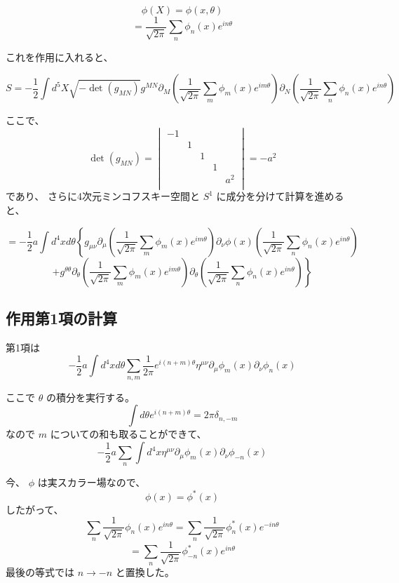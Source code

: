 \documentclass{article}
\begin{document}
$$
	\phi(X)
	=
	\phi(x,\theta)
$$
$$
	=
	\dfrac{1}{
		\sqrt{ 2 \pi}
	}
	\sum_{n}
	\phi_{n}(x)
	e^{i n \theta}
$$

これを作用に入れると、

$$
	S
	=
	- \dfrac{1}{2}
	\int d^{5} X
	\sqrt{ - \det(g_{MN}) }
	g^{MN}
	\partial_{M}
	\left(
	\dfrac{1}{
		\sqrt{ 2 \pi}
	}
	\sum_{m}
	\phi_{m}(x)
	e^{i m \theta}
	\right)
	\partial_{N}
	\left(
	\dfrac{1}{
		\sqrt{ 2 \pi}
	}
	\sum_{n}
	\phi_{n}(x)
	e^{i n \theta}
	\right)
$$

ここで、
$$
	\det(g_{MN})
	=
	\begin{vmatrix}
		-1 &   &   &   &       \\
		   & 1 &   &   &       \\
		   &   & 1 &   &       \\
		   &   &   & 1 &       \\
		   &   &   &   & a^{2} \\
	\end{vmatrix}
	=
	- a^{2}
$$
であり、
さらに4次元ミンコフスキー空間と
$S^{1}$
に成分を分けて計算を進めると、

$$
	=
	- \dfrac{1}{2}
	a
	\int d^{4} x d \theta
	\left\{
	g_{\mu \nu}
	\partial_{\mu}
	\left(
	\dfrac{1}{
		\sqrt{ 2 \pi}
	}
	\sum_{m}
	\phi_{m}(x)
	e^{i m \theta}
	\right)
	\partial_{\nu}
	\phi(x)
	\left(
	\dfrac{1}{
		\sqrt{ 2 \pi}
	}
	\sum_{n}
	\phi_{n}(x)
	e^{i n \theta}
	\right)
	\right.
$$
$$
	\left.
	+
	g^{\theta \theta}
	\partial_{\theta}
	\left(
	\dfrac{1}{
		\sqrt{ 2 \pi}
	}
	\sum_{m}
	\phi_{m}(x)
	e^{i m \theta}
	\right)
	\partial_{\theta}
	\left(
	\dfrac{1}{
		\sqrt{ 2 \pi}
	}
	\sum_{n}
	\phi_{n}(x)
	e^{i n \theta}
	\right)
	\right\}
$$

\subsection{作用第1項の計算}

第1項は
$$
	- \dfrac{1}{2}
	a
	\int d^{4} x d \theta
	\sum_{n,m}
	\dfrac{1}{2 \pi}
	e^{i (n+m) \theta}
	\eta^{\mu \nu}
	\partial_{\mu}
	\phi_{m}(x)
	\partial_{\nu}
	\phi_{n}(x)
$$

ここで
$\theta$
の積分を実行する。
$$
	\int d \theta
	e^{i (n+m) \theta}
	=
	2 \pi
	\delta_{n,-m}
$$
なので
$m$
についての和も取ることができて、
$$
	- \dfrac{1}{2}
	a
	\sum_{n}
	\int d^{4} x
	\eta^{\mu \nu}
	\partial_{\mu}
	\phi_{m}(x)
	\partial_{\nu}
	\phi_{-n}(x)
$$

今、
$\phi$
は実スカラー場なので、
$$
	\phi(x) = \phi^{*}(x)
$$
したがって、
$$
	\sum_{n}
	\dfrac{1}{\sqrt{ 2 \pi}}
	\phi_{n}(x)
	e^{i n \theta}
	=
	\sum_{n}
	\dfrac{1}{\sqrt{ 2 \pi}}
	\phi_{n}^{*}(x)
	e^{- i n \theta}
$$
$$
	=
	\sum_{n}
	\dfrac{1}{\sqrt{ 2 \pi}}
	\phi_{-n}^{*}(x)
	e^{i n \theta}
$$
最後の等式では
$n \to -n$
と置換した。
\end{document}
